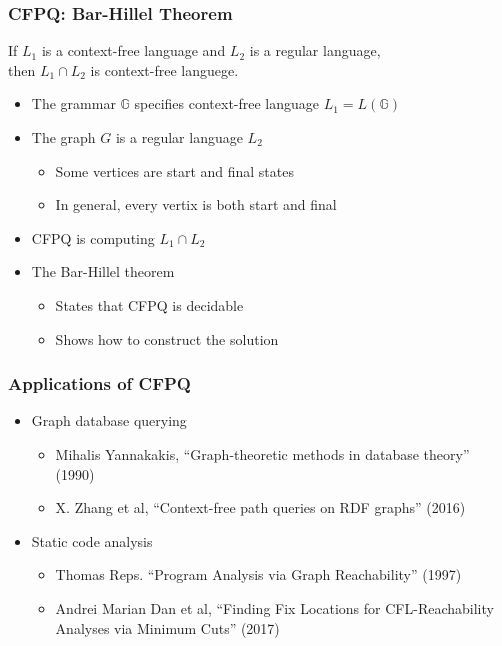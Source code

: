 \documentclass[xcolor=table]{beamer}
\begin{document}
\begin{frame} \frametitle{CFPQ: Bar-Hillel Theorem}

\begin{theorem}
	If $L_1$ is a context-free language and $L_2$ is a regular language, \\ then $L_1 \cap L_2$ is context-free languege.
\end{theorem}

  \begin{itemize}
    \item The grammar $\mathbb{G}$ specifies context-free language $L_1 = L(\mathbb{G})$
    \pause
    \item The graph $G$ is a regular language $L_2$
    \begin{itemize}
      \item Some vertices are start and final states
      \pause
      \item In general, every vertix is both start and final 
    \end{itemize}
    \pause
    \item CFPQ is computing $L_1 \cap L_2$
    \pause
    \item The Bar-Hillel theorem
      \begin{itemize}
        \item States that CFPQ is decidable
        \item Shows how to construct the solution
      \end{itemize}

  \end{itemize}
\end{frame}

\begin{frame} \frametitle{Applications of CFPQ}
\begin{itemize}
	\item Graph database querying
  \begin{itemize}
  	\item Mihalis Yannakakis, ``Graph-theoretic methods in database theory'' (1990)
    \item X. Zhang et al, ``Context-free path queries on RDF graphs'' (2016)
  \end{itemize}
  \pause
  \item Static code analysis
  \begin{itemize}
  	\item Thomas Reps. ``Program Analysis via Graph Reachability'' (1997)
    \item Andrei Marian Dan et al, ``Finding Fix Locations for CFL-Reachability Analyses via Minimum Cuts'' (2017)
  \end{itemize}
\end{itemize}
\end{frame}
\end{document}
